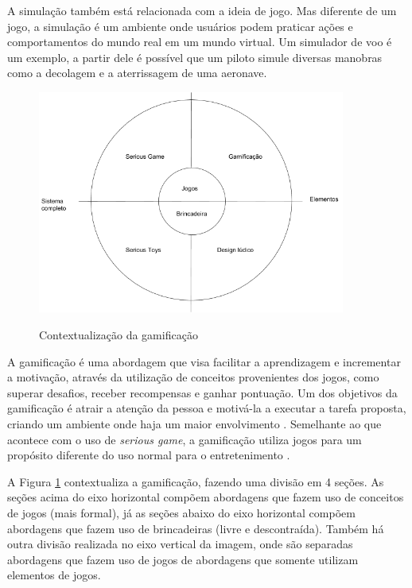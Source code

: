 \documentclass[
	12pt,				%
	oneside,			%
	a4paper,			%
	english,			%
	french,				%
	spanish,			%
	brazil,				%
	]{abntex2}
\begin{document}
A simulação também está relacionada com a ideia de jogo. Mas diferente de um jogo, a simulação é um ambiente onde usuários podem praticar ações e comportamentos do mundo real em um mundo virtual. Um simulador de voo é um exemplo, a partir dele é possível que um piloto simule diversas manobras como a decolagem e a aterrissagem de uma aeronave.

\begin{figure}[ht]
\centering
\caption{Contextualização da gamificação }
\includegraphics[width=0.9\textwidth]{imagens/gamificacao.png}
\label{fig:gamificacao}
\end{figure}

A gamificação é uma abordagem que visa facilitar a aprendizagem e incrementar a motivação, através da utilização de conceitos provenientes dos jogos, como superar desafios, receber recompensas e ganhar pontuação. Um dos objetivos da gamificação é atrair a atenção da pessoa e motivá-la a executar a tarefa proposta, criando um ambiente onde haja um maior envolvimento \cite{kaap:2014}. Semelhante ao que acontece com o uso de \textit{serious game}, a gamificação utiliza jogos para um propósito diferente do uso normal para o entretenimento \cite{deterding2011game}.

A Figura \ref{fig:gamificacao} contextualiza a gamificação, fazendo uma divisão em 4 seções. As seções acima do eixo horizontal compõem abordagens que fazem uso de conceitos de jogos (mais formal), já as seções abaixo do eixo horizontal compõem abordagens que fazem uso de brincadeiras (livre e descontraída). Também há outra divisão realizada no eixo vertical da imagem, onde são separadas abordagens que fazem uso de jogos  de abordagens que somente utilizam elementos de jogos.
\end{document}
